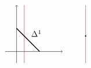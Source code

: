 \documentclass[10pt]{article}
\begin{document}
\[\begin{tikzpicture}
  \draw[->] (0, -1/2) -- (0, 2);
  \draw[->] (-1/2, 0) -- (2, 0);

  \draw[color = red] (1/3, -1/2) -- (1/3, 2);
  
  \draw[line width = 1pt] (1,0) -- node[above right] {\(\Delta^1\)} (0,1);

  \draw[color = red] (3, -1/2) -- (3, 2);

  \node[circle, fill = black, inner sep = 0.2mm] at (3, 2/3) {};
\end{tikzpicture}\]
\end{document}
